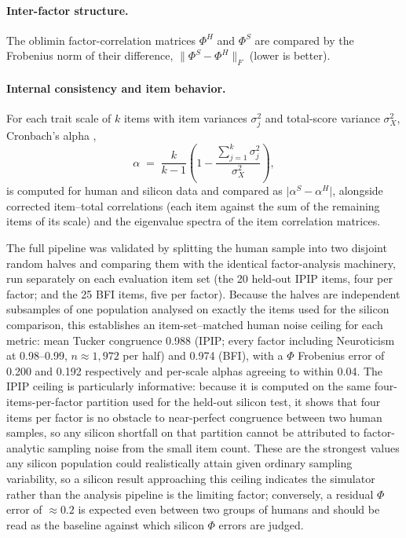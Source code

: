 \documentclass[11pt]{article}
\begin{document}
\paragraph{Inter-factor structure.} The oblimin factor-correlation matrices $\Phi^{H}$ and $\Phi^{S}$ are compared by the Frobenius norm of their difference, $\lVert \Phi^{S} - \Phi^{H} \rVert_F$ (lower is better).

\paragraph{Internal consistency and item behavior.} For each trait scale of $k$ items with item variances $\sigma^2_j$ and total-score variance $\sigma^2_X$, Cronbach's alpha \citep{cronbach1951},
\begin{equation}
\alpha \;=\; \frac{k}{k-1}\left(1 - \frac{\sum_{j=1}^{k} \sigma^2_j}{\sigma^2_X}\right),
\label{eq:alpha}
\end{equation}
is computed for human and silicon data and compared as $\lvert \alpha^{S} - \alpha^{H} \rvert$, alongside corrected item--total correlations (each item against the sum of the remaining items of its scale) and the eigenvalue spectra of the item correlation matrices.

The full pipeline was validated by splitting the human sample into two disjoint random halves and comparing them with the identical factor-analysis machinery, run separately on each evaluation item set (the 20 held-out IPIP items, four per factor; and the 25 BFI items, five per factor). Because the halves are independent subsamples of one population analysed on exactly the items used for the silicon comparison, this establishes an item-set--matched human noise ceiling for each metric: mean Tucker congruence 0.988 (IPIP; every factor including Neuroticism at 0.98--0.99, $n \approx 1{,}972$ per half) and 0.974 (BFI), with a $\Phi$ Frobenius error of 0.200 and 0.192 respectively and per-scale alphas agreeing to within 0.04. The IPIP ceiling is particularly informative: because it is computed on the same four-items-per-factor partition used for the held-out silicon test, it shows that four items per factor is no obstacle to near-perfect congruence between two human samples, so any silicon shortfall on that partition cannot be attributed to factor-analytic sampling noise from the small item count. These are the strongest values any silicon population could realistically attain given ordinary sampling variability, so a silicon result approaching this ceiling indicates the simulator rather than the analysis pipeline is the limiting factor; conversely, a residual $\Phi$ error of $\approx 0.2$ is expected even between two groups of humans and should be read as the baseline against which silicon $\Phi$ errors are judged.
\end{document}

